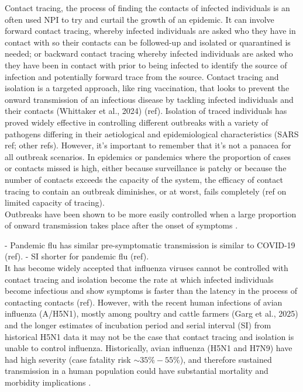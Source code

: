 \documentclass{article}
\begin{document}
Contact tracing, the process of finding the contacts of infected individuals is an often used NPI to try and curtail the growth of an epidemic. It can involve forward contact tracing, whereby infected individuals are asked who they have in contact with so their contacts can be followed-up and isolated or quarantined is needed; or backward contact tracing whereby infected individuals are asked who they have been in contact with prior to being infected to identify the source of infection and potentially forward trace from the source. Contact tracing and isolation is a targeted approach, like ring vaccination, that looks to prevent the onward transmission of an infectious disease by tackling infected individuals and their contacts \citep{kucharskiEffectivenessRingVaccination2016} (Whittaker et al., 2024) (ref). Isolation of traced individuals has proved widely effective in controlling different outbreaks with a variety of pathogens differing in their aetiological and epidemiological characteristics (SARS ref; other refs). However, it's important to remember that it's not a panacea for all outbreak scenarios. In epidemics or pandemics where the proportion of cases or contacts missed is high, either because surveillance is patchy or because the number of contacts exceeds the capacity of the system, the efficacy of contact tracing to contain an outbreak diminishes, or at worst, fails completely \citep{dhillonWhenContactTracing2018} (ref on limited capacity of tracing). \\

Outbreaks have been shown to be more easily controlled when a large proportion of onward transmission takes place after the onset of symptoms \citep{fraserFactorsThatMake2004}.

- Pandemic flu has similar pre-symptomatic transmission is similar to COVID-19 (ref).
- SI shorter for pandemic flu (ref). \\

It has become widely accepted that influenza viruses cannot be controlled with contact tracing and isolation become the rate at which infected individuals become infectious and show symptoms is faster than the latency in the process of contacting contacts (ref). However, with the recent human infections of avian influenza (A/H5N1), mostly among poultry and cattle farmers (Garg et al., 2025) and the longer estimates of incubation period and serial interval (SI) from historical H5N1 data \citep{Ward2024.12.11.24318702} it may not be the case that contact tracing and isolation is unable to control influenza. Historically, avian influenza (H5N1 and H7N9) have had high severity (case fatality risk $\sim 35\%-55\%$), and therefore sustained transmission in a human population could have substantial mortality and morbidity implications \citep{tannerPandemicPotentialAvian2015}. \\
\end{document}
